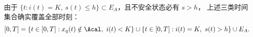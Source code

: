 由于 $\{t:i(t)=K,\ s(t)\le h\}\subset E_A$，且不安全状态必有 $s>h$，
上述三类时间集合确实覆盖全部时刻：
\[
[0,T]
=\{t\in[0,T]:x_q(t)\notin\Acal,\ i(t)<K\}
\cup\{t\in[0,T]:i(t)=K,\ s(t)>h\}
\cup E_A.
\]
